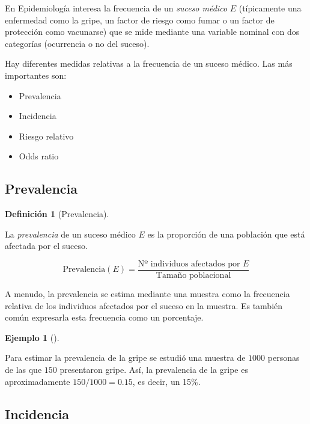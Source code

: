 \documentclass[
  a4paper,
]{scrreport}
\providecommand{\tightlist}{%
  \setlength{\itemsep}{0pt}\setlength{\parskip}{0pt}}\usepackage{longtable,booktabs,array}
\theoremstyle{plain}
\theoremstyle{definition}
\newtheorem{definition}{Definición}[chapter]
\theoremstyle{definition}
\newtheorem{example}{Ejemplo}[chapter]
\theoremstyle{remark}
\begin{document}
En Epidemiología interesa la frecuencia de un \emph{suceso médico} \(E\)
(típicamente una enfermedad como la gripe, un factor de riesgo como
fumar o un factor de protección como vacunarse) que se mide mediante una
variable nominal con dos categorías (ocurrencia o no del suceso).

Hay diferentes medidas relativas a la frecuencia de un suceso médico.
Las más importantes son:

\begin{itemize}
\tightlist
\item
  Prevalencia
\item
  Incidencia
\item
  Riesgo relativo
\item
  Odds ratio
\end{itemize}

\subsection{Prevalencia}\label{prevalencia}

\begin{definition}[Prevalencia]\protect\hypertarget{def-prevalencia}{}\label{def-prevalencia}

La \emph{prevalencia} de un suceso médico \(E\) es la proporción de una
población que está afectada por el suceso.

\[\mbox{Prevalencia}(E) = \frac{\mbox{Nº individuos afectados por $E$}}{\mbox{Tamaño poblacional}}\]

\end{definition}

A menudo, la prevalencia se estima mediante una muestra como la
frecuencia relativa de los individuos afectados por el suceso en la
muestra. Es también común expresarla esta frecuencia como un porcentaje.

\begin{example}[]\protect\hypertarget{exm-prevalencia}{}\label{exm-prevalencia}

Para estimar la prevalencia de la gripe se estudió una muestra de
\(1000\) personas de las que \(150\) presentaron gripe. Así, la
prevalencia de la gripe es aproximadamente \(150/1000=0.15\), es decir,
un 15\%.

\end{example}

\subsection{Incidencia}\label{incidencia}
\end{document}
